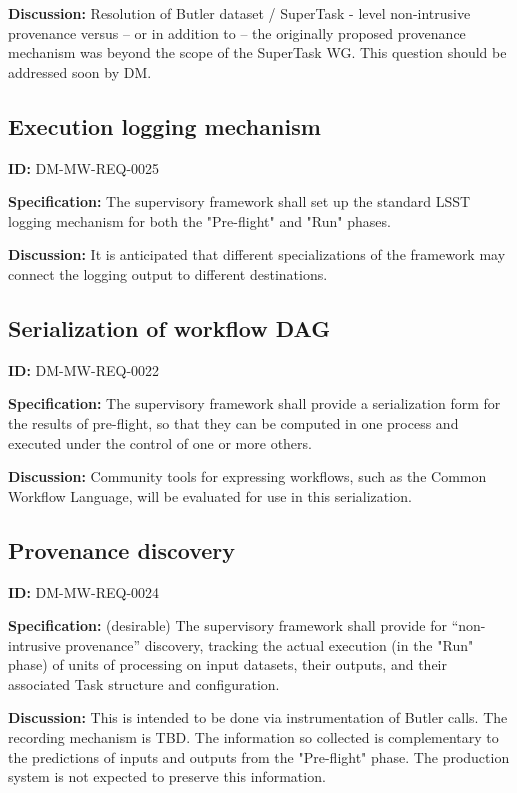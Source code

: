 \documentclass[SE,toc,lsstdraft]{lsstdoc}
\begin{document}
\textbf{Discussion:}
Resolution of Butler dataset / SuperTask - level non-intrusive provenance versus – or in addition to – the originally proposed provenance mechanism was beyond the scope of the SuperTask WG. This question should be addressed soon by DM.

\subsection{Execution logging mechanism}

\label{DM-MW-REQ-0025}
\textbf{ID:} DM-MW-REQ-0025

\textbf{Specification:}
The supervisory framework shall set up the standard LSST logging mechanism for both the "Pre-flight" and "Run" phases.

\textbf{Discussion:}
It is anticipated that different specializations of the framework may connect the logging output to different destinations.

\subsection{Serialization of workflow DAG}

\label{DM-MW-REQ-0022}
\textbf{ID:} DM-MW-REQ-0022

\textbf{Specification:}
The supervisory framework shall provide a serialization form for the results of pre-flight, so that they can be computed in one process and executed under the control of one or more others.

\textbf{Discussion:}
Community tools for expressing workflows, such as the Common Workflow Language, will be evaluated for use in this serialization.

\subsection{Provenance discovery}

\label{DM-MW-REQ-0024}
\textbf{ID:} DM-MW-REQ-0024

\textbf{Specification:}
(desirable) The supervisory framework shall provide for “non-intrusive provenance” discovery, tracking the actual execution (in the "Run" phase) of units of processing on input datasets, their outputs, and their associated Task structure and configuration.

\textbf{Discussion:}
This is intended to be done via instrumentation of Butler calls. The recording mechanism is TBD. The information so collected is complementary to the predictions of inputs and outputs from the "Pre-flight" phase. The production system is not expected to preserve this information.
\end{document}
